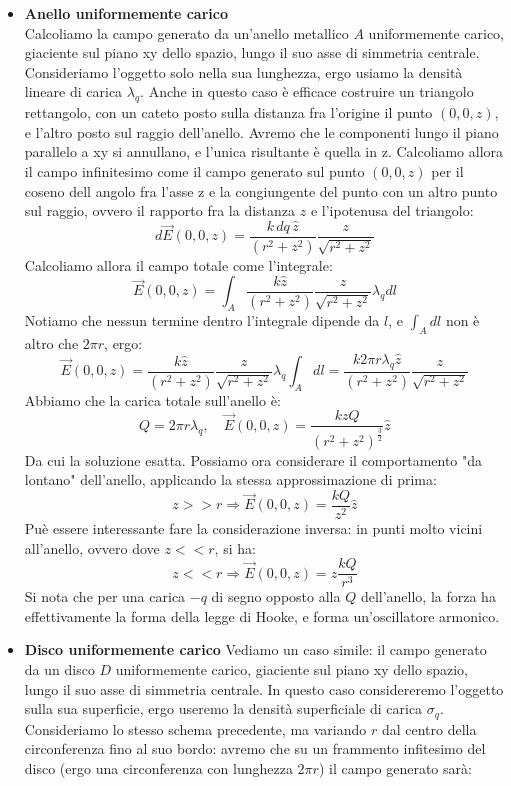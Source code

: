 \documentclass[a4paper,12pt]{article}
\begin{document}
\begin{itemize}
  \item \textbf{Anello uniformemente carico} \\
    Calcoliamo la campo generato da un'anello metallico $A$ uniformemente carico, giaciente sul piano xy dello spazio, lungo il suo asse di simmetria centrale. Consideriamo l'oggetto solo nella sua lunghezza, ergo usiamo la densità lineare di carica $\lambda_q$. Anche
    in questo caso è efficace costruire un triangolo rettangolo, con un cateto posto sulla distanza fra l'origine il punto $(0,0,z)$, e l'altro posto sul raggio dell'anello. Avremo che le componenti lungo il piano parallelo a xy si annullano, e l'unica risultante è quella in z.
    Calcoliamo allora il campo infinitesimo come il campo generato sul punto $(0,0,z)$ per il coseno dell angolo fra l'asse z e la congiungente del punto con un altro punto sul raggio, ovvero il rapporto fra la distanza $z$ e l'ipotenusa del triangolo:
    $$ d\vec{E}(0,0,z) = \frac{k\,dq\,\hat{z}}{(r^2+z^2)} \frac{z}{\sqrt{r^2+z^2}} $$
    Calcoliamo allora il campo totale come l'integrale:
    $$ \vec{E}(0,0, z) = \int_A  \frac{k\hat{z}}{(r^2+z^2)} \frac{z}{\sqrt{r^2+z^2}}\lambda_q dl $$
    Notiamo che nessun termine dentro l'integrale dipende da $l$, e $\int_A dl$ non è altro che $2\pi r$, ergo:
    $$ \vec{E}(0,0,z) =  \frac{k\hat{z}}{(r^2+z^2)} \frac{z}{\sqrt{r^2+z^2}}\lambda_q \int_A dl = \frac{k 2\pi r \lambda_q \hat{z}}{(r^2+z^2)} \frac{z}{\sqrt{r^2+z^2}} $$
    Abbiamo che la carica totale sull'anello è:
    $$ Q = 2\pi r \lambda_q, \quad \vec{E}(0,0,z) = \frac{kzQ}{(r^2+z^2)^\frac{3}{2}}\hat{z} $$
    Da cui la soluzione esatta. Possiamo ora considerare il comportamento "da lontano" dell'anello, applicando la stessa approssimazione di prima:
    $$ z >> r \Rightarrow \vec{E}(0,0,z) = \frac{kQ}{z^2}\hat{z} $$
    Puè essere interessante fare la considerazione inversa: in punti molto vicini all'anello, ovvero dove $z << r$, si ha:
    $$ z << r \Rightarrow \vec{E}(0,0,z) = z\frac{kQ}{r^3} $$
    Si nota che per una carica $-q$ di segno opposto alla $Q$ dell'anello, la forza ha effettivamente la forma della legge di Hooke, e forma un'oscillatore armonico.
  \item \textbf{Disco uniformemente carico}
    Vediamo un caso simile: il campo generato da un disco $D$ uniformemente carico, giaciente sul piano xy dello spazio, lungo il suo asse di simmetria centrale. In questo caso considereremo l'oggetto sulla sua superficie, ergo useremo la densità superficiale
    di carica $\sigma_q$. Consideriamo lo stesso schema precedente, ma variando $r$ dal centro della circonferenza fino al suo bordo: avremo che su un frammento infitesimo del disco (ergo una circonferenza con lunghezza $2\pi r$) il campo generato sarà:

\end{itemize}
\end{document}
